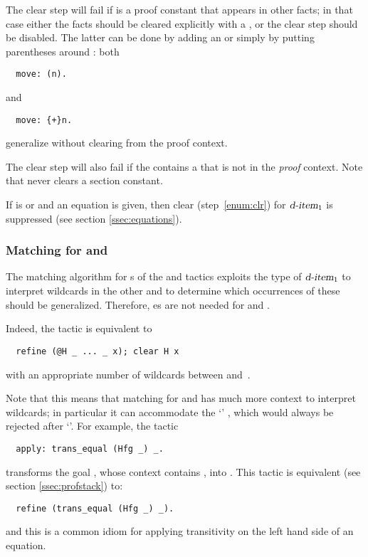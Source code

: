 The clear step will fail if {\term} is a proof constant that
appears in other facts; in that case either the facts should be
cleared explicitly with a , or the clear step should be
disabled. The latter can be done by adding an  or simply by
putting parentheses around {\term}: both
\begin{lstlisting}
  move: (n).
\end{lstlisting}
and
\begin{lstlisting}
  move: {+}n.
\end{lstlisting}
generalize  without clearing  from the proof context.

The clear step will also fail if the  contains a
 that is not in the \emph{proof} context.
Note that \ssr{} never clears a section constant.

If {\tac} is  or  and an equation  is given,
then clear (step~\ref{enum:clr}) for $\ssrN[1]{d-item}$ is suppressed
(see section \ref{ssec:equations}).

\subsubsection*{Matching for  and }\label{sss:strongapply}

The matching algorithm for s of the \ssr{}  and
 tactics
exploits the type of $\ssrN[1]{d-item}$ to interpret
wildcards in the other  and to determine which occurrences of
these should be generalized.
Therefore, es are not needed for  and .

Indeed, the \ssr{} tactic  is equivalent to
\begin{lstlisting}
  refine (@H _ ... _ x); clear H x
\end{lstlisting}
with an appropriate number of wildcards between  and~.

Note that this means that matching for  and  has
much more context to interpret wildcards; in particular it can accommodate
the `\ssrC{_}' , which would always be rejected after `'.
For example, the tactic
\begin{lstlisting}
  apply: trans_equal (Hfg _) _.
\end{lstlisting}
transforms the goal , whose context contains
, into .
This tactic is equivalent (see section \ref{ssec:profstack}) to:
\begin{lstlisting}
  refine (trans_equal (Hfg _) _).
\end{lstlisting}
and this is a common idiom for applying transitivity on the left hand side
of an equation.

